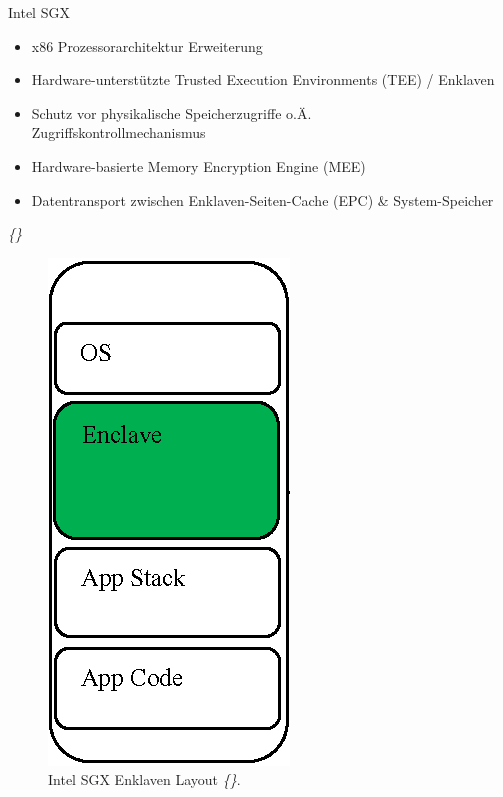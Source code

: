\documentclass{sdqbeamer}
\begin{document}
\begin{frame}{Intel SGX}
	\begin{minipage}{0.55\linewidth}
		\begin{itemize}
			\item x86 Prozessorarchitektur Erweiterung
			\item Hardware-unterstützte Trusted Execution Environments (TEE) / Enklaven
			\item Schutz vor physikalische Speicherzugriffe o.Ä.\\
				Zugriffskontrollmechanismus
			\item Hardware-basierte Memory Encryption Engine (MEE)
			\item Datentransport zwischen Enklaven-Seiten-Cache (EPC) \& System-Speicher
		\end{itemize}
		\vspace{1ex}
		\vfill
		\small\textit{\{\cite{costan, knauth, mofrad, swami}\}}
	\end{minipage}
	\begin{minipage}{0.44\linewidth}
		\begin{figure}[!h]
			\centering
			\includegraphics[width=0.35\linewidth]{Bilder/Intel_sgx_enclave.png}
			\caption{Intel SGX Enklaven Layout \textit{\{\cite{intel_sgx_enclave}\}}. }
		\end{figure}
	\end{minipage}
\end{frame}
\end{document}
